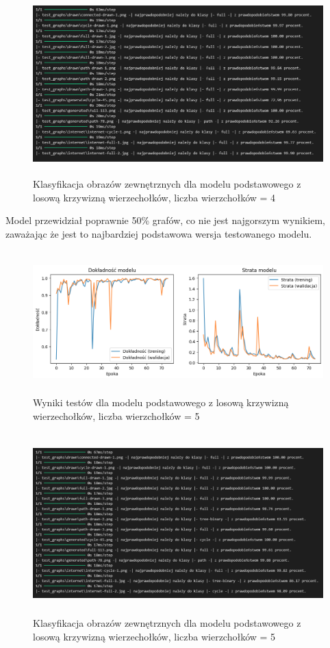 \begin{figure}[ht]
	\centering
	\includegraphics[height=7cm]{resources/tests/images/v3/base4_txt.png}
	\caption{Klasyfikacja obrazów zewnętrznych dla modelu podstawowego z losową krzywizną wierzechołków, liczba wierzchołków = 4}
	\label{Fig:tests-base-2}
\end{figure}
\FloatBarrier

Model przewidział poprawnie 50\% grafów, co nie jest najgorszym wynikiem,
zaważając że jest to najbardziej podstawowa wersja testowanego modelu.


\begin{figure}[ht]
	\centering
	\includegraphics[height=5.5cm]{resources/tests/images/v3/base5_img.png}
	\caption{Wyniki testów dla modelu podstawowego z losową krzywizną wierzechołków, liczba wierzchołków = 5}
	\label{Fig:tests-base-3}
\end{figure}
\FloatBarrier

\begin{figure}[ht]
	\centering
	\includegraphics[height=7cm]{resources/tests/images/v3/base5_txt.png}
	\caption{Klasyfikacja obrazów zewnętrznych dla modelu podstawowego z losową krzywizną wierzechołków, liczba wierzchołków = 5}
	\label{Fig:tests-base-4}
\end{figure}
\FloatBarrier

